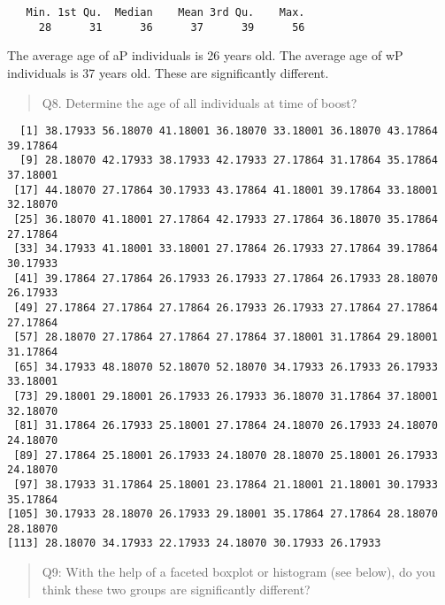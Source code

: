 \documentclass[
  letterpaper,
  DIV=11,
  numbers=noendperiod]{scrartcl}
\newenvironment{Shaded}{\begin{snugshade}}{\end{snugshade}}
\newcommand{\FunctionTok}[1]{\textcolor[rgb]{0.28,0.35,0.67}{#1}}
\newcommand{\NormalTok}[1]{\textcolor[rgb]{0.00,0.23,0.31}{#1}}
\newcommand{\OtherTok}[1]{\textcolor[rgb]{0.00,0.23,0.31}{#1}}
\newcommand{\SpecialCharTok}[1]{\textcolor[rgb]{0.37,0.37,0.37}{#1}}
\newcommand{\StringTok}[1]{\textcolor[rgb]{0.13,0.47,0.30}{#1}}
\begin{document}
\begin{verbatim}
   Min. 1st Qu.  Median    Mean 3rd Qu.    Max. 
     28      31      36      37      39      56 
\end{verbatim}

The average age of aP individuals is 26 years old. The average age of wP
individuals is 37 years old. These are significantly different.

\begin{quote}
Q8. Determine the age of all individuals at time of boost?
\end{quote}

\begin{Shaded}
\end{Shaded}

\begin{verbatim}
  [1] 38.17933 56.18070 41.18001 36.18070 33.18001 36.18070 43.17864 39.17864
  [9] 28.18070 42.17933 38.17933 42.17933 27.17864 31.17864 35.17864 37.18001
 [17] 44.18070 27.17864 30.17933 43.17864 41.18001 39.17864 33.18001 32.18070
 [25] 36.18070 41.18001 27.17864 42.17933 27.17864 36.18070 35.17864 27.17864
 [33] 34.17933 41.18001 33.18001 27.17864 26.17933 27.17864 39.17864 30.17933
 [41] 39.17864 27.17864 26.17933 26.17933 27.17864 26.17933 28.18070 26.17933
 [49] 27.17864 27.17864 27.17864 26.17933 26.17933 27.17864 27.17864 27.17864
 [57] 28.18070 27.17864 27.17864 27.17864 37.18001 31.17864 29.18001 31.17864
 [65] 34.17933 48.18070 52.18070 52.18070 34.17933 26.17933 26.17933 33.18001
 [73] 29.18001 29.18001 26.17933 26.17933 36.18070 31.17864 37.18001 32.18070
 [81] 31.17864 26.17933 25.18001 27.17864 24.18070 26.17933 24.18070 24.18070
 [89] 27.17864 25.18001 26.17933 24.18070 28.18070 25.18001 26.17933 24.18070
 [97] 38.17933 31.17864 25.18001 23.17864 21.18001 21.18001 30.17933 35.17864
[105] 30.17933 28.18070 26.17933 29.18001 35.17864 27.17864 28.18070 28.18070
[113] 28.18070 34.17933 22.17933 24.18070 30.17933 26.17933
\end{verbatim}

\begin{quote}
Q9: With the help of a faceted boxplot or histogram (see below), do you
think these two groups are significantly different?
\end{quote}
\end{document}
